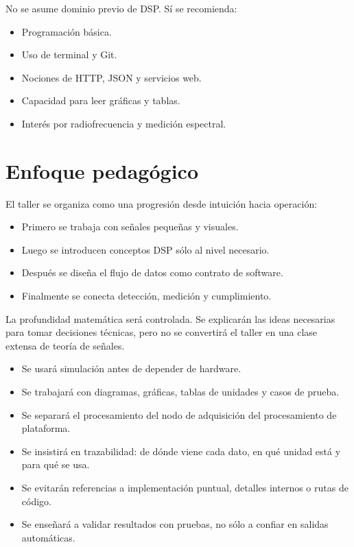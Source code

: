 \documentclass[11pt,a4paper]{article}
\begin{document}
No se asume dominio previo de DSP. Sí se recomienda:

\begin{itemize}
  \item Programación básica.
  \item Uso de terminal y Git.
  \item Nociones de HTTP, JSON y servicios web.
  \item Capacidad para leer gráficas y tablas.
  \item Interés por radiofrecuencia y medición espectral.
\end{itemize}

\section*{Enfoque pedagógico}

El taller se organiza como una progresión desde intuición hacia operación:

\begin{itemize}
  \item Primero se trabaja con señales pequeñas y visuales.
  \item Luego se introducen conceptos DSP sólo al nivel necesario.
  \item Después se diseña el flujo de datos como contrato de software.
  \item Finalmente se conecta detección, medición y cumplimiento.
\end{itemize}

La profundidad matemática será controlada. Se explicarán las ideas necesarias para tomar decisiones técnicas, pero no se convertirá el taller en una clase extensa de teoría de señales.

\begin{itemize}
  \item Se usará simulación antes de depender de hardware.
  \item Se trabajará con diagramas, gráficas, tablas de unidades y casos de prueba.
  \item Se separará el procesamiento del nodo de adquisición del procesamiento de plataforma.
  \item Se insistirá en trazabilidad: de dónde viene cada dato, en qué unidad está y para qué se usa.
  \item Se evitarán referencias a implementación puntual, detalles internos o rutas de código.
  \item Se enseñará a validar resultados con pruebas, no sólo a confiar en salidas automáticas.
\end{itemize}
\end{document}
